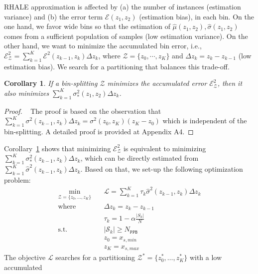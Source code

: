 \documentclass{ecai}  %
\newtheorem{corollary}[theorem]{Corollary}
\begin{document}
RHALE approximation is affected by (a) the number of instances
(estimation variance) and (b) the error term \(\mathcal{E}(z_1, z_2)\)
(estimation bias), in each bin.  On the one hand, we favor wide bins
so that the estimation of
\(\hat{\mu}(z_1, z_2), \hat{\sigma}(z_1, z_2)\) comes from a
sufficient population of samples (low estimation variance).  On the
other hand, we want to minimize the accumulated bin error, i.e.,
\( \mathcal{E}^2_{\mathcal{Z}} = \sum_{k=1}^K\mathcal{E}^2(z_{k-1},
z_k) \Delta z_k\), where \(\mathcal{Z} = \{z_0, \cdots, z_K\}\) and
\(\Delta z_k = z_k - z_{k-1}\) (low estimation bias).  We search for a
partitioning that balances this trade-off.
%
\begin{corollary}
  \label{sec:coroll}
  If a bin-splitting \(\mathcal{Z}\) minimizes the accumulated error $\mathcal{E}^2_{\mathcal{Z}}$,
  then it also minimizes
  \(\sum_{k=1}^K\sigma_*^2(z_1, z_2) \Delta z_k \).
\end{corollary}
%
\begin{proof}
  ~\label{sec:coroll-1} The proof is based on the observation that
  \(\sum_{k=1}^K \sigma^2(z_{k-1}, z_k) \Delta z_k = \sigma^2(z_0,
  z_K) (z_K - z_0)\) which is independent of the bin-splitting.
  A detailed proof is provided at Appendix A4.%
\end{proof}
%
Corollary~\ref{sec:coroll} shows that minimizing
\( \mathcal{E}^2_{\mathcal{Z}} \) is equivalent to minimizing
\(\sum_{k=1}^K \sigma_*^2(z_{k-1}, z_k)\Delta z_k\), which can be directly
estimated from \(\sum_{k=1}^K \hat{\sigma}^2(z_{k-1}, z_k) \Delta z_k \).
Based on that, we set-up the following optimization problem:
%
\begin{equation}
  \label{eq:opt}
\begin{aligned}
  \min_{ \mathcal{Z} = \{z_0, \ldots, z_K\}} \quad & \mathcal{L} = \sum_{k=1}^K \tau_k \hat{\sigma}^2(z_{k-1}, z_k) \Delta z_k \\
  \textrm{where} \quad & \Delta z_k = z_k - z_{k-1} \\
  & \tau_k = 1 - \alpha \frac{|S_k|}{N} \\
  \textrm{s.t.} \quad & |\mathcal{S}_k| \geq N_{\mathtt{PPB}}\\
                                     & z_0 = x_{s,min}\\
                                     & z_K = x_{s, max}
\end{aligned}
\end{equation}
%
The objective \(\mathcal{L}\) searches for a partitioning
\(\mathcal{Z}^* = \{ z_0^*, \ldots, z_K^* \} \) with a low accumulated
\end{document}
